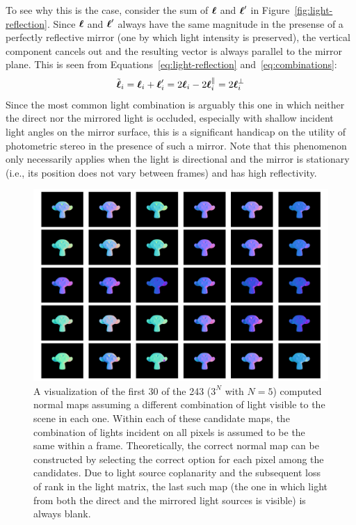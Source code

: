 To see why this is the case, consider the sum of $\boldsymbol{\ell}$ and $\boldsymbol{\ell}'$ in
Figure~\ref{fig:light-reflection}. Since $\boldsymbol{\ell}$ and $\boldsymbol{\ell}'$ always have the
same magnitude in the presense of a perfectly reflective mirror (one by which
light intensity is preserved), the vertical component cancels out and the
resulting vector is always parallel to the mirror plane. This is seen from
Equations~\ref{eq:light-reflection} and~\ref{eq:combinations}:
\begin{equation}
    \tilde{\boldsymbol{\ell}}_i = \boldsymbol{\ell}_i + \boldsymbol{\ell}_i'
                     = 2 \boldsymbol{\ell}_i - 2 \boldsymbol{\ell}_i^\parallel
                     = 2 \boldsymbol{\ell}_i^\perp
\end{equation}
Since the most common light combination is arguably this one in which neither
the direct nor the mirrored light is occluded, especially with shallow incident
light angles on the mirror surface, this is a significant handicap on the
utility of photometric stereo in the presence of such a mirror. Note that this
phenomenon only necessarily applies when the light is directional and the
mirror is stationary (i.e., its position does not vary between frames) and has
high reflectivity.
\begin{figure}
  \includegraphics[width=\columnwidth]{images/output-candidates}
  \caption{A visualization of the first 30 of the 243 ($3^N$ with $N = 5$)
  computed normal maps assuming a different combination of light visible to the
  scene in each one. Within each of these candidate maps, the combination of
  lights incident on all pixels is assumed to be the same within a frame.
  Theoretically, the correct normal map can be constructed by selecting the
  correct option for each pixel among the candidates. Due to light source
  coplanarity and the subsequent loss of rank in the light matrix, the last
  such map (the one in which light from both the direct and the mirrored light
  sources is visible) is always blank.}\label{fig:output-candidates}
\end{figure}
